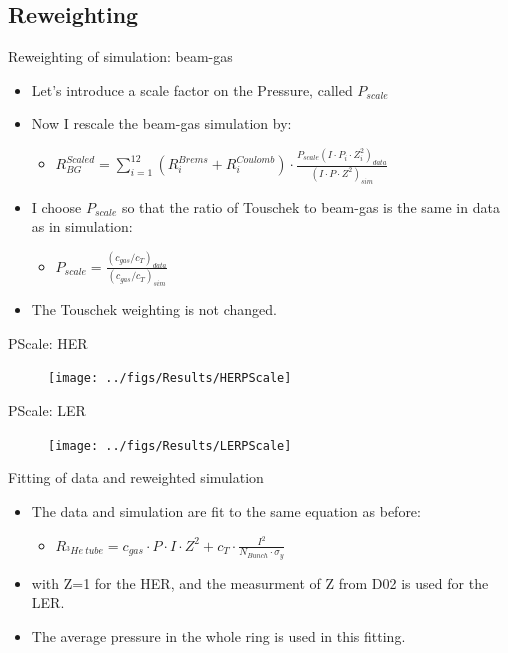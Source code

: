 \documentclass[xcolor=dvipsnames]{beamer}
\begin{document}
\subsection{Reweighting}

\begin{frame}{Reweighting of simulation: beam-gas}
\begin{itemize}
	\item
	Let's introduce a scale factor on the Pressure, called $P_{scale}$
	\item
	Now I rescale the beam-gas simulation by:
	\begin{itemize}
		\item
		$R_{BG}^{Scaled} = \sum _{i=1}^{12}(R^{Brems}_i+R^{Coulomb}_i)\cdot\frac{P_{scale}(I\cdot P_i\cdot Z_{i}^{2})_{data}} {(I\cdot P\cdot Z^{2})_{sim}}$
	\end{itemize}
	\item
	I choose $P_{scale}$ so that the ratio of Touschek to beam-gas is the same in data as in simulation:
	\begin{itemize}
		\item
		$P_{scale} = \frac{(c_{gas}/c_{T})_{data}}{(c_{gas}/c_{T})_{sim}}$
	\end{itemize}
	\item
	The Touschek weighting is not changed.

\end{itemize}
\end{frame}

\begin{frame}{PScale: HER}
\begin{figure}	
	\texttt{[image: ../figs/Results/HERPScale]}
\end{figure}
\end{frame}

\begin{frame}{PScale: LER}
\begin{figure}	
	\texttt{[image: ../figs/Results/LERPScale]}
\end{figure}
\end{frame}

\begin{frame}{Fitting of data and reweighted simulation}
\begin{itemize}
	\item
	The data and simulation are fit to the same equation as before:
	\begin{itemize}
		\item
		$R_{^{3}He\ tube} = c_{gas}\cdot P\cdot I\cdot Z^{2}+c_{T}\cdot \frac{I^{2}}{N_{Bunch}\cdot\sigma_{y}}$
	\end{itemize}
	\item
	with Z=1 for the HER, and the measurment of Z from D02 is used for the LER.
	\item
	The average pressure in the whole ring is used in this fitting.

\end{itemize}
\end{frame}
\end{document}
